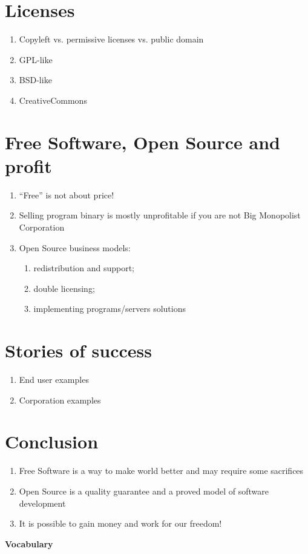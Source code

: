 \documentclass[10pt,a4paper]{article}
\newcommand{\bee}{\begin{enumerate}\setlength{\itemsep}{-0.65mm}}
\newcommand{\ene}{\end{enumerate}}
\begin{document}
\begin{multicols}{2}
\section{Licenses}
\bee
  \item Copyleft vs. permissive licenses vs. public domain
  \item GPL-like
  \item BSD-like
  \item CreativeCommons
\ene

\section{Free Software, Open Source and profit}
\bee
  \item ``Free'' is not about price!
  \item Selling program binary is mostly unprofitable if you are not Big Monopolist Corporation
  \item Open Source business models:
  \bee
    \item redistribution and support;
    \item double licensing;
    \item implementing programs/servers solutions
  \ene
\ene

\section{Stories of success}
\bee
  \item End user examples
  \item Corporation examples
\ene

\section*{Conclusion}
\bee
  \item Free Software is a way to make world better and may require some 
sacrifices
  \item Open Source is a quality guarantee and a proved model of software development
  \item It is possible to gain money and work for our freedom!
\ene

\end{multicols}

\begin{center}
{\LARGE \bfseries Vocabulary}
\end{center}
\end{document}
